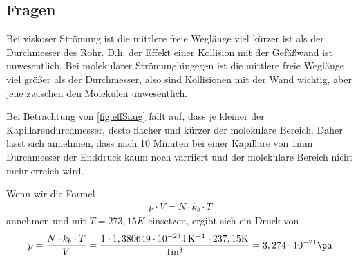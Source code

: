 \documentclass[11pt, a4paper]{article}
\begin{document}
    \subsection{Fragen}
    Bei viskoser Strömung ist die mittlere freie Weglänge viel kürzer ist als der Durchmesser des Rohr. D.h. der Effekt einer Kollision mit der Gefäßwand ist unwesentlich. Bei molekularer Strömunghingegen ist die mittlere freie Weglänge viel größer als der Durchmesser, also sind Kollisionen mit der Wand wichtig, aber jene zwischen den Molekülen unwesentlich.

    Bei Betrachtung von \ref*{fig:effSaug} fällt auf, dass je kleiner der Kapillarendurchmesser, desto flacher und kürzer der molekulare Bereich.
    Daher lässt sich annehmen, dass nach 10 Minuten bei einer Kapillare von 1mm Durchmesser der Enddruck kaum noch varriiert und der molekulare Bereich nicht mehr erreich wird.



    Wenn wir die Formel
    \begin{align}
        p \cdot V = N \cdot k_b \cdot T
    \end{align}
    annehmen und mit $T = 273,15K$ einsetzen, ergibt sich ein Druck von
    \begin{align}
        p = \frac{N \cdot k_b \cdot T}{V} = \frac{1 \cdot 1,380649 \cdot 10^{-23} \si{\joule\per\kelvin} \cdot 237,15 \si{\kelvin}}{1 \si{\meter\cubed}} = 3,274 \cdot 10^{-21} \si{\pa}
    \end{align}

    
    
\end{document}
